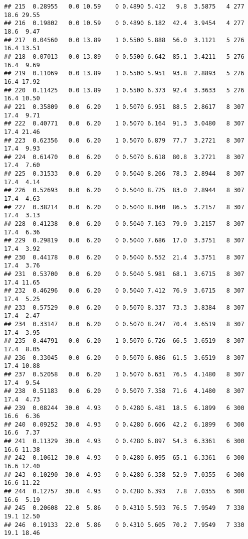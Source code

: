 \documentclass[
]{article}
\begin{document}
\begin{verbatim}
## 215  0.28955   0.0 10.59    0 0.4890 5.412   9.8  3.5875   4 277    18.6 29.55
## 216  0.19802   0.0 10.59    0 0.4890 6.182  42.4  3.9454   4 277    18.6  9.47
## 217  0.04560   0.0 13.89    1 0.5500 5.888  56.0  3.1121   5 276    16.4 13.51
## 218  0.07013   0.0 13.89    0 0.5500 6.642  85.1  3.4211   5 276    16.4  9.69
## 219  0.11069   0.0 13.89    1 0.5500 5.951  93.8  2.8893   5 276    16.4 17.92
## 220  0.11425   0.0 13.89    1 0.5500 6.373  92.4  3.3633   5 276    16.4 10.50
## 221  0.35809   0.0  6.20    1 0.5070 6.951  88.5  2.8617   8 307    17.4  9.71
## 222  0.40771   0.0  6.20    1 0.5070 6.164  91.3  3.0480   8 307    17.4 21.46
## 223  0.62356   0.0  6.20    1 0.5070 6.879  77.7  3.2721   8 307    17.4  9.93
## 224  0.61470   0.0  6.20    0 0.5070 6.618  80.8  3.2721   8 307    17.4  7.60
## 225  0.31533   0.0  6.20    0 0.5040 8.266  78.3  2.8944   8 307    17.4  4.14
## 226  0.52693   0.0  6.20    0 0.5040 8.725  83.0  2.8944   8 307    17.4  4.63
## 227  0.38214   0.0  6.20    0 0.5040 8.040  86.5  3.2157   8 307    17.4  3.13
## 228  0.41238   0.0  6.20    0 0.5040 7.163  79.9  3.2157   8 307    17.4  6.36
## 229  0.29819   0.0  6.20    0 0.5040 7.686  17.0  3.3751   8 307    17.4  3.92
## 230  0.44178   0.0  6.20    0 0.5040 6.552  21.4  3.3751   8 307    17.4  3.76
## 231  0.53700   0.0  6.20    0 0.5040 5.981  68.1  3.6715   8 307    17.4 11.65
## 232  0.46296   0.0  6.20    0 0.5040 7.412  76.9  3.6715   8 307    17.4  5.25
## 233  0.57529   0.0  6.20    0 0.5070 8.337  73.3  3.8384   8 307    17.4  2.47
## 234  0.33147   0.0  6.20    0 0.5070 8.247  70.4  3.6519   8 307    17.4  3.95
## 235  0.44791   0.0  6.20    1 0.5070 6.726  66.5  3.6519   8 307    17.4  8.05
## 236  0.33045   0.0  6.20    0 0.5070 6.086  61.5  3.6519   8 307    17.4 10.88
## 237  0.52058   0.0  6.20    1 0.5070 6.631  76.5  4.1480   8 307    17.4  9.54
## 238  0.51183   0.0  6.20    0 0.5070 7.358  71.6  4.1480   8 307    17.4  4.73
## 239  0.08244  30.0  4.93    0 0.4280 6.481  18.5  6.1899   6 300    16.6  6.36
## 240  0.09252  30.0  4.93    0 0.4280 6.606  42.2  6.1899   6 300    16.6  7.37
## 241  0.11329  30.0  4.93    0 0.4280 6.897  54.3  6.3361   6 300    16.6 11.38
## 242  0.10612  30.0  4.93    0 0.4280 6.095  65.1  6.3361   6 300    16.6 12.40
## 243  0.10290  30.0  4.93    0 0.4280 6.358  52.9  7.0355   6 300    16.6 11.22
## 244  0.12757  30.0  4.93    0 0.4280 6.393   7.8  7.0355   6 300    16.6  5.19
## 245  0.20608  22.0  5.86    0 0.4310 5.593  76.5  7.9549   7 330    19.1 12.50
## 246  0.19133  22.0  5.86    0 0.4310 5.605  70.2  7.9549   7 330    19.1 18.46

\end{verbatim}
\end{document}
